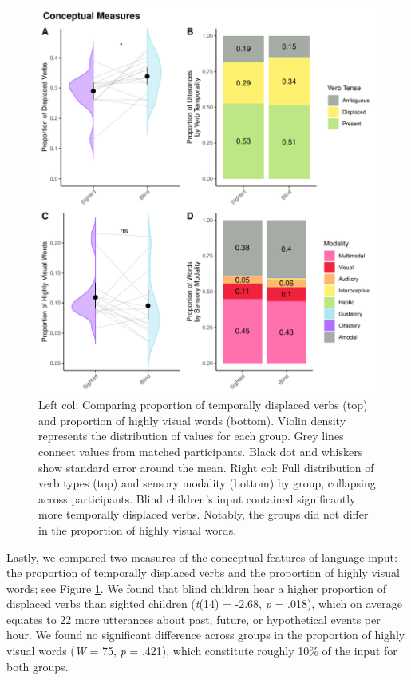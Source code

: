 \documentclass[
  man,floatsintext]{apa6}
\begin{document}
\begin{figure}
\includegraphics{input_quality_manuscript_files/figure-latex/conceptual-plots-1} \caption{Left col: Comparing proportion of temporally displaced verbs (top) and proportion of highly visual words (bottom). Violin density represents the distribution of values for each group. Grey lines connect values from matched participants. Black dot and whiskers show standard error around the mean. Right col: Full distribution of verb types (top)  and sensory modality (bottom) by group, collapsing across participants. Blind children's input contained significantly more temporally displaced verbs. Notably, the groups did not differ in the proportion of highly visual words.}\label{fig:conceptual-plots}
\end{figure}

Lastly, we compared two measures of the conceptual features of language input: the proportion of temporally displaced verbs and the proportion of highly visual words; see Figure \ref{fig:conceptual-plots}. We found that blind children hear a higher proportion of displaced verbs than sighted children (\emph{t}(14) = -2.68, \emph{p} = .018), which on average equates to 22 more utterances about past, future, or hypothetical events per hour. We found no significant difference across groups in the proportion of highly visual words (\emph{W} = 75, \emph{p} = .421), which constitute roughly 10\% of the input for both groups.
\end{document}
